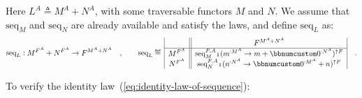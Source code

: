 Here $L^{A}\triangleq M^{A}+N^{A}$, with some traversable functors
$M$ and $N$. We assume that $\text{seq}_{M}$ and $\text{seq}_{N}$
are already available and satisfy the laws, and define $\text{seq}_{L}$
as:
\[
\text{seq}_{L}:M^{F^{A}}+N^{F^{A}}\rightarrow F^{M^{A}+N^{A}}\quad,\quad\quad\text{seq}_{L}\triangleq\,\begin{array}{|c||c|}
 & F^{M^{A}+N^{A}}\\
\hline M^{F^{A}} & \text{seq}_{M}^{F,A}\bef(m^{:M^{A}}\rightarrow m+\bbnum 0^{:N^{A}})^{\uparrow F}\\
N^{F^{A}} & \text{seq}_{N}^{F,A}\bef(n^{:N^{A}}\rightarrow\bbnum 0^{:M^{A}}+n)^{\uparrow F}
\end{array}\quad.
\]

\begin{comment}
It helps to rewrite $\text{seq}_{L}$ as a composition of two matrices,
separating the functions lifted to $F$:
\begin{align*}
 & \text{seq}_{L}\triangleq\,\begin{array}{|c||cc|}
 & F^{M^{A}} & F^{N^{A}}\\
\hline M^{F^{A}} & \text{seq}_{M}^{F,A} & \bbnum 0\\
N^{F^{A}} & \bbnum 0 & \text{seq}_{N}^{F,A}
\end{array}\,\bef\,\begin{array}{|c||c|}
 & F^{M^{A}+N^{A}}\\
\hline F^{M^{A}} & (m^{:M^{A}}\rightarrow m+\bbnum 0^{:N^{A}})^{\uparrow F}\\
F^{N^{A}} & (n^{:N^{A}}\rightarrow\bbnum 0^{:M^{A}}+n)^{\uparrow F}
\end{array}\\
 & =\,\begin{array}{|c||cc|}
 & F^{M^{A}} & F^{N^{A}}\\
\hline M^{F^{A}} & \text{seq}_{M}^{F,A} & \bbnum 0\\
N^{F^{A}} & \bbnum 0 & \text{seq}_{N}^{F,A}
\end{array}\,\bef\,\begin{array}{|c||c|}
 & F^{M^{A}+N^{A}}\\
\hline F^{M^{A}} & (m^{:M^{A}}\rightarrow m+\bbnum 0^{:N^{A}})^{\uparrow F}\\
F^{N^{A}} & (n^{:N^{A}}\rightarrow\bbnum 0^{:M^{A}}+n)^{\uparrow F}
\end{array}\quad.
\end{align*}
\end{comment}
To verify the identity law~(\ref{eq:identity-law-of-sequence}):
